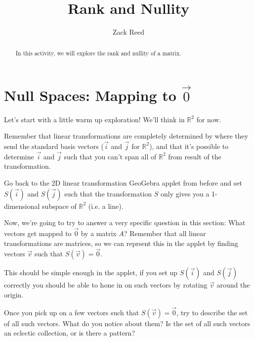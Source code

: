 \documentclass{ximera}
\author{Zack Reed}
\title{Rank and Nullity}
\begin{document}
\begin{abstract}

In this activity, we will explore the rank and nullity of a matrix.

\end{abstract}
\maketitle

\section*{Null Spaces: Mapping to $\vec{0}$}

\begin{exploration}

    Let's start with a little warm up exploration! We'll think in $\mathbb{R}^2$ for now.
    
    Remember that linear transformations are completely determined by where they send the standard basis vectors ($\vec{i}$ and $\vec{j}$ for $\mathbb{R}^2$), and that it's possible to determine $\vec{i}$ and $\vec{j}$ such that you can't span all of $\mathbb{R}^2$ from result of the transformation.

    Go back to the 2D linear transformation GeoGebra applet from before and set $S(\vec{i})$ and $S(\vec{j})$ such that the transformation $S$ only gives you a 1-dimensional subspace of $\mathbb{R}^2$ (i.e. a line).
    
\begin{center}
\end{center}

    Now, we're going to try to answer a very specific question in this section: What vectors get mapped to $\vec{0}$ by a matrix $A$? Remember that all linear transformations are matrices, so we can reprsent this in the applet by finding vectors $\vec{v}$ such that $S(\vec{v})=\vec{0}$.

    This should be simple enough in the applet, if you set up $S(\vec{i})$ and $S(\vec{j})$ correctly you should be able to hone in on such vectors by rotating $\vec{v}$ around the origin.

    Once you pick up on a few vectors such that $S(\vec{v})=\vec{0}$, try to describe the set of all such vectors. What do you notice about them? Is the set of all such vectors an eclectic collection, or is there a pattern?

    \begin{solution}


\end{solution}
\end{exploration}
\end{document}
